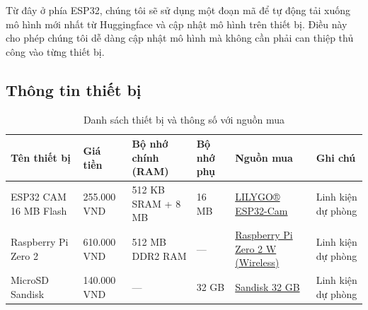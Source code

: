 \quad Từ đây ở phía ESP32, chúng tôi sẽ sử dụng một đoạn mã để tự động tải xuống mô hình mới nhất từ Huggingface và cập nhật mô hình trên thiết bị. Điều này cho phép chúng tôi dễ dàng cập nhật mô hình mà không cần phải can thiệp thủ công vào từng thiết bị.

\pagebreak
\subsection{Thông tin thiết bị}

\begin{table}[h!]
    \centering
    \caption{Danh sách thiết bị và thông số với nguồn mua}
    \begin{tabular}{|p{3cm}|p{2.5cm}|p{2cm}|p{2.5cm}|p{3cm}|p{1.75cm}|}
        \hline
        \textbf{Tên thiết bị} & \textbf{Giá tiền} & \textbf{Bộ nhớ chính (RAM)} & \textbf{Bộ nhớ phụ} & \textbf{Nguồn mua} & \textbf{Ghi chú} \\ \hline
        ESP32 CAM 16 MB Flash & 255.000 VND & 512 KB SRAM + 8 MB & 16 MB & \href{https://vi.aliexpress.com/item/1005005059816321.html?gatewayAdapt=glo2vnm}{LILYGO® ESP32-Cam} & Linh kiện dự phòng \\ \hline
        Raspberry Pi Zero 2 & 610.000 VND & 512 MB DDR2 RAM & — & \href{https://raspberrypi.vn/san-pham/raspberry-pi-zero-2-w-wireless}{Raspberry Pi Zero 2 W (Wireless)} & Linh kiện dự phòng \\ \hline
        MicroSD Sandisk & 140.000 VND & — & 32 GB & \href{https://raspberrypi.vn/san-pham/the-nho-microsd-sandisk-32gb-100mb-s}{Sandisk 32 GB} & Linh kiện dự phòng \\ \hline
    \end{tabular}
\end{table}

